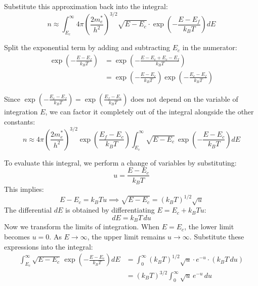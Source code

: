 Substitute this approximation back into the integral:
\begin{equation*}
    n \approx \int_{E_c}^{\infty} 4\pi\!\left(\frac{2m^*_e}{h^2}\right)^{\!3/2}\!\sqrt{E - E_c} \cdot \exp\!\left(-\frac{E - E_f}{k_B T}\right) dE
\end{equation*}

Split the exponential term by adding and subtracting $E_c$ in the numerator:
\begin{align*}
    \exp\!\left(-\frac{E - E_f}{k_B T}\right) & = \exp\!\left(-\frac{E - E_c + E_c - E_f}{k_B T}\right)                                 \\
                                              & = \exp\!\left(-\frac{E - E_c}{k_B T}\right) \exp\!\left(-\frac{E_c - E_f}{k_B T}\right)
\end{align*}

Since $\exp\!\left(-\frac{E_c - E_f}{k_B T}\right) = \exp\!\left(\frac{E_f - E_c}{k_B T}\right)$ does not depend on the variable of integration $E$, we can factor it completely out of the integral alongside the other constants:
\begin{equation*}
    n \approx 4\pi\!\left(\frac{2m^*_e}{h^2}\right)^{\!3/2}\exp\!\left(\frac{E_f - E_c}{k_B T}\right)\int_{E_c}^{\infty}\sqrt{E - E_c}\,\exp\!\left(-\frac{E - E_c}{k_B T}\right)dE
\end{equation*}

To evaluate this integral, we perform a change of variables by substituting:
\begin{equation*}
    u = \frac{E - E_c}{k_B T}
\end{equation*}
This implies:
\begin{equation*}
    E - E_c = k_B T u \implies \sqrt{E - E_c} = (k_B T)^{1/2} \sqrt{u}
\end{equation*}
The differential $dE$ is obtained by differentiating $E = E_c + k_B T u$:
\begin{equation*}
    dE = k_B T \, du
\end{equation*}
Now we transform the limits of integration. When $E = E_c$, the lower limit becomes $u = 0$. As $E \to \infty$, the upper limit remains $u \to \infty$. Substitute these expressions into the integral:
\begin{align*}
    \int_{E_c}^{\infty} \sqrt{E - E_c}\,\exp\!\left(-\frac{E - E_c}{k_B T}\right)dE & = \int_0^\infty (k_B T)^{1/2} \sqrt{u} \cdot e^{-u} \cdot (k_B T \, du) \\
                                                                                    & = (k_B T)^{3/2} \int_0^\infty \sqrt{u}\,e^{-u}\,du
\end{align*}

